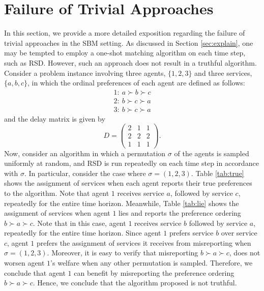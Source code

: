 \documentclass[letterpaper,11pt]{article}
\begin{document}
\section{Failure of Trivial Approaches}
In this section, we provide a more detailed exposition regarding the failure of trivial approaches in the SBM setting. As discussed in Section \ref{sec:explain}, one may be tempted to employ a one-shot matching algorithm on each time step, such as RSD. However, such an approach does not result in a truthful algorithm. Consider a problem instance involving three agents, $\{1, 2, 3\}$ and three services, $\{a, b , c\}$, in which the ordinal preferences of each agent are defined as follows:
\begin{align*}
1:\: a \succ b \succ c \\
2:\: b \succ c \succ a \\
3:\: b \succ c \succ a
\end{align*}
and the delay matrix is given by
\begin{equation*}
    D = \begin{pmatrix}
        2 & 1 & 1 \\
        2 & 2 & 2 \\
        1 & 1 & 1
    \end{pmatrix}.
\end{equation*}
Now, consider an algorithm in which a permutation $\sigma$ of the agents is sampled uniformly at random, and RSD is run repeatedly on each time step in accordance with $\sigma$. In particular, consider the case where  $\sigma = (1, 2, 3)$. Table \ref{tab:true} shows the assignment of services when each agent reports their true preferences to the algorithm. Note that agent $1$ receives service $a$, followed by service $c$, repeatedly for the entire time horizon. Meanwhile, Table \ref{tab:lie} shows the assignment of services when agent $1$ lies and reports the preference ordering $b \succ a \succ c$. Note that in this case, agent $1$ receives service $b$ followed by service $a$, repeatedly for the entire time horizon.  Since agent $1$ prefers service $b$ over service $c$, agent $1$ prefers the assignment of services it receives from misreporting when $\sigma = (1, 2, 3)$. Moreover, it is easy to verify that misreporting $b \succ a \succ c$, does not worsen agent $1$'s welfare when any other permutation is sampled. Therefore, we conclude that agent $1$ can benefit by misreporting the preference ordering $b \succ a \succ c$. Hence, we conclude that the algorithm proposed is not truthful.
\end{document}
